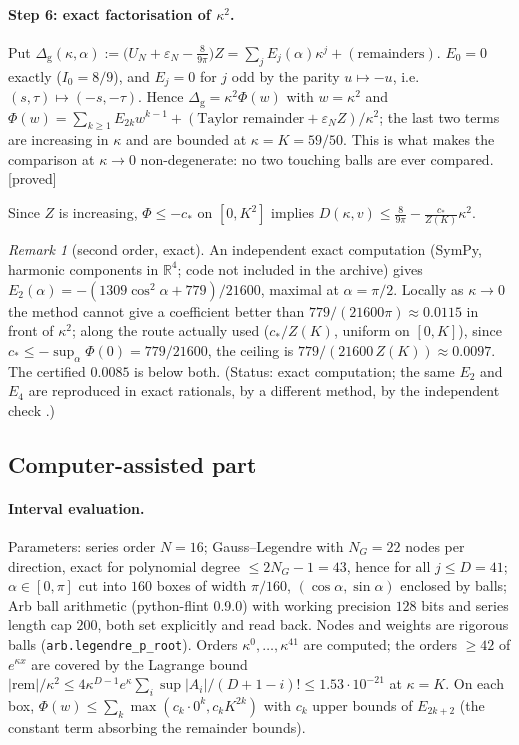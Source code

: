 \documentclass[11pt,a4paper]{article}
\theoremstyle{remark}
\newtheorem{remark}[theorem]{Remark}
\theoremstyle{definition}
\theoremstyle{plain}
\theoremstyle{remark}
\newcommand{\R}{\mathbb{R}}
\newcommand{\st}[1]{\textsf{[#1]}}
\begin{document}
\paragraph{Step 6: exact factorisation of $\kappa^2$.} Put
$\Delta_{\mathrm g}(\kappa,\alpha):=\big(U_N+\varepsilon_N-\tfrac{8}{9\pi}\big)Z=\sum_jE_j(\alpha)\kappa^j+(\text{remainders})$.
$E_0=0$ exactly ($I_0=8/9$), and $E_j=0$ for $j$ odd by the parity $u\mapsto-u$, i.e.\ $(s,\tau)\mapsto(-s,-\tau)$.
Hence $\Delta_{\mathrm g}=\kappa^2\Phi(w)$ with $w=\kappa^2$ and
$\Phi(w)=\sum_{k\ge1}E_{2k}w^{k-1}+(\text{Taylor remainder}+\varepsilon_NZ)/\kappa^2$; the last two terms
are increasing in $\kappa$ and are bounded at $\kappa=K=59/50$. This is what makes the comparison at
$\kappa\to0$ non-degenerate: no two touching balls are ever compared. \st{proved}

Since $Z$ is increasing, $\Phi\le-c_\ast$ on $[0,K^2]$ implies
$D(\kappa,v)\le\frac{8}{9\pi}-\frac{c_\ast}{Z(K)}\kappa^2$.

\begin{remark}[second order, exact]
An independent exact computation (SymPy, harmonic components in $\R^4$; code not included in the archive)
gives $E_2(\alpha)=-(1309\cos^2\alpha+779)/21600$, maximal at $\alpha=\pi/2$. Locally as $\kappa\to0$ the
method cannot give a coefficient better than $779/(21600\pi)\approx0.0115$ in front of $\kappa^2$; along the
route actually used ($c_\ast/Z(K)$, uniform on $[0,K]$), since $c_\ast\le-\sup_\alpha\Phi(0)=779/21600$, the
ceiling is $779/(21600\,Z(K))\approx0.0097$. The certified $0.0085$ is below both.
(Status: exact computation; the same $E_2$ and $E_4$ are reproduced in exact rationals, by a different method,
by the independent check .)
\end{remark}

\subsection{Computer-assisted part}\label{sec:cap}

\paragraph{Interval evaluation.} Parameters: series order $N=16$; Gauss--Legendre with $N_G=22$ nodes per
direction, exact for polynomial degree $\le2N_G-1=43$, hence for all $j\le D=41$; $\alpha\in[0,\pi]$ cut into
$160$ boxes of width $\pi/160$, $(\cos\alpha,\sin\alpha)$ enclosed by balls; Arb ball arithmetic
(python-flint 0.9.0) with working precision $128$ bits and series length cap $200$, both set explicitly and
read back. Nodes and weights are rigorous balls (\texttt{arb.legendre\_p\_root}). Orders $\kappa^0,\dots,\kappa^{41}$
are computed; the orders $\ge42$ of $e^{\kappa x}$ are covered by the Lagrange bound
$|\text{rem}|/\kappa^2\le4\kappa^{D-1}e^{\kappa}\sum_i\sup|A_i|/(D+1-i)!\le1.53\cdot10^{-21}$ at $\kappa=K$.
On each box, $\Phi(w)\le\sum_k\max(c_k\cdot0^k,c_kK^{2k})$ with $c_k$ upper bounds of $E_{2k+2}$ (the constant
term absorbing the remainder bounds).
\end{document}
